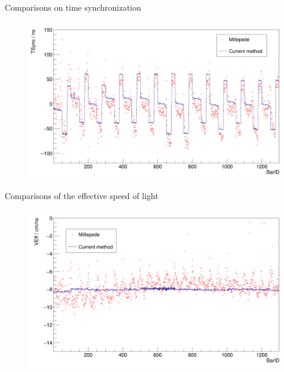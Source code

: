 \documentclass[compress, 13pt, aspectratio=169]{beamer}
\begin{document}
\begin{frame}[t]{Comparisons on time synchronization}
	\begin{figure}[t]
		\vspace*{-1em}
		\centering
		\includegraphics[height = 0.9 \textheight]{tsync.png}
	\end{figure}
\end{frame}

\begin{frame}[t]{Comparisons of the effective speed of light}
	\begin{figure}[t]
		\vspace*{-1em}
		\centering
		\includegraphics[height = 0.9 \textheight]{effective_c.png}
	\end{figure}
\end{frame}
\end{document}
